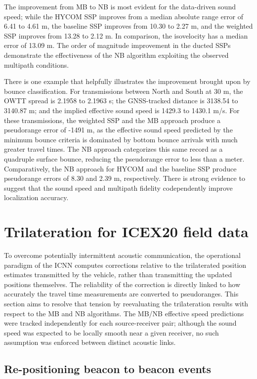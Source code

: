 The improvement from MB to NB is most evident for the data-driven sound speed; while the HYCOM SSP improves from a median absolute range error of 6.41 to 4.61 m, the baseline SSP improves from 10.30 to 2.27 m, and the weighted SSP improves from 13.28 to 2.12 m.
In comparison, the isovelocity has a median error of 13.09 m.
The order of magnitude improvement in the ducted SSPs demonstrate the effectiveness of the NB algorithm exploiting the observed multipath conditions.

 There is one example that helpfully illustrates the improvement brought upon by bounce classification.
For transmissions between North and South at 30 m, the OWTT spread is 2.1958 to 2.1963 s; the GNSS-tracked distance is 3138.54 to 3140.87 m; and the implied effective sound speed is 1429.3 to 1430.1 m/s.
For these transmissions, the weighted SSP and the MB approach produce a pseudorange error of -1491 m, as the effective sound speed predicted by the minimum bounce criteria is dominated by bottom bounce arrivals with much greater travel times.
The NB approach categorizes this same record as a quadruple surface bounce, reducing the pseudorange error to less than a meter.
Comparatively, the NB approach for HYCOM and the baseline SSP produce pseudorange errors of 8.30 and 2.39 m, respectively. 
There is strong evidence to suggest that the sound speed and multipath fidelity codependently improve localization accuracy.

\clearpage
\section{Trilateration for ICEX20 field data}\label{sec:trilat}

To overcome potentially intermittent acoustic communication, the operational paradigm of the ICNN computes corrections relative to the trilaterated position estimates transmitted by the vehicle, rather than transmitting the updated positions themselves.
The reliability of the correction is directly linked to how accurately the travel time measurements are converted to pseudoranges.
This section aims to resolve that tension by reevaluating the trilateration results with respect to the MB and NB algorithms.
The MB/NB effective speed predictions were tracked independently for each source-receiver pair; although the sound speed was expected to be locally smooth near a given receiver, no such assumption was enforced between distinct acoustic links.

\subsection{Re-positioning beacon to beacon events}

